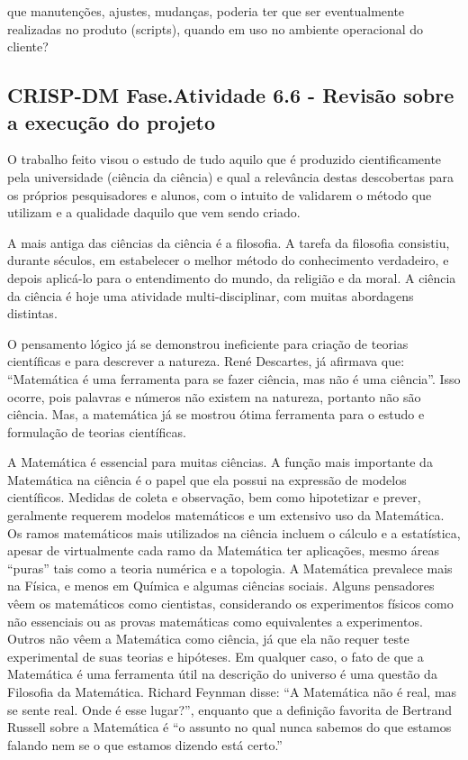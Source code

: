 \documentclass[]{article}
\begin{document}
que manutenções, ajustes, mudanças, poderia ter que ser eventualmente
realizadas no produto (scripts), quando em uso no ambiente operacional
do cliente?

\subsection{CRISP-DM Fase.Atividade 6.6 - Revisão sobre a execução do
projeto}\label{crisp-dm-fase.atividade-6.6---revisao-sobre-a-execucao-do-projeto}

O trabalho feito visou o estudo de tudo aquilo que é produzido
cientificamente pela universidade (ciência da ciência) e qual a
relevância destas descobertas para os próprios pesquisadores e alunos,
com o intuito de validarem o método que utilizam e a qualidade daquilo
que vem sendo criado.

A mais antiga das ciências da ciência é a filosofia. A tarefa da
filosofia consistiu, durante séculos, em estabelecer o melhor método do
conhecimento verdadeiro, e depois aplicá-lo para o entendimento do
mundo, da religião e da moral. A ciência da ciência é hoje uma atividade
multi-disciplinar, com muitas abordagens distintas.

O pensamento lógico já se demonstrou ineficiente para criação de teorias
científicas e para descrever a natureza. René Descartes, já afirmava
que: ``Matemática é uma ferramenta para se fazer ciência, mas não é uma
ciência''. Isso ocorre, pois palavras e números não existem na natureza,
portanto não são ciência. Mas, a matemática já se mostrou ótima
ferramenta para o estudo e formulação de teorias científicas.

A Matemática é essencial para muitas ciências. A função mais importante
da Matemática na ciência é o papel que ela possui na expressão de
modelos científicos. Medidas de coleta e observação, bem como
hipotetizar e prever, geralmente requerem modelos matemáticos e um
extensivo uso da Matemática. Os ramos matemáticos mais utilizados na
ciência incluem o cálculo e a estatística, apesar de virtualmente cada
ramo da Matemática ter aplicações, mesmo áreas ``puras'' tais como a
teoria numérica e a topologia. A Matemática prevalece mais na Física, e
menos em Química e algumas ciências sociais. Alguns pensadores vêem os
matemáticos como cientistas, considerando os experimentos físicos como
não essenciais ou as provas matemáticas como equivalentes a
experimentos. Outros não vêem a Matemática como ciência, já que ela não
requer teste experimental de suas teorias e hipóteses. Em qualquer caso,
o fato de que a Matemática é uma ferramenta útil na descrição do
universo é uma questão da Filosofia da Matemática. Richard Feynman
disse: ``A Matemática não é real, mas se sente real. Onde é esse
lugar?'', enquanto que a definição favorita de Bertrand Russell sobre a
Matemática é ``o assunto no qual nunca sabemos do que estamos falando
nem se o que estamos dizendo está certo.''
\end{document}

